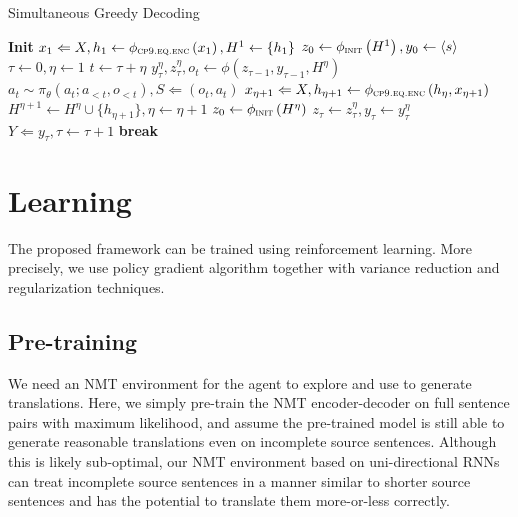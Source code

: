 \begin{algorithm}
\caption{Simultaneous Greedy Decoding}
\label{cp9.algo.algo1}
\begin{algorithmic}[1]
{}
\State \textbf{Init} $x_1 \Leftarrow X, h_1 \gets \phi_{\textsc{cp9.eq.enc}}\left(x_1\right), H^1 \gets \{h_1\}$
\State \hspace{17pt} $z_0 \gets \phi_{\textsc{init}}\left(H^1\right), y_0 \gets \left<s\right>$
\State \hspace{17pt} $\tau \gets 0, \eta \gets 1$
\State $t \gets \tau + \eta$
\State $y_{\tau}^{\eta}, z_{\tau}^{\eta}, o_t \gets \phi\left(z_{\tau-1}, y_{\tau-1}, H^{\eta}\right)$ 
\State $a_t \sim \pi_{\theta}\left(a_t; a_{<t}, o_{<t}\right), S \Leftarrow (o_t, a_t)$
\State $x_{\eta+1} \Leftarrow X, h_{\eta+1} \gets \phi_{\textsc{cp9.eq.enc}}\left(h_{\eta}, x_{\eta+1}\right)$
\State $H^{\eta+1} \gets H^{\eta} \cup \{h_{\eta+1} \}, \eta \gets \eta + 1$
 $z_0 \gets \phi_{\textsc{init}}\left(H^{\eta}\right)$
\EndIf
{}
\State $z_{\tau} \gets z_{\tau}^{\eta}, y_{\tau} \gets y_{\tau}^{\eta}$ 
\State $Y \Leftarrow y_{\tau}, \tau \gets \tau + 1$
 \textbf{break}
\EndIf
\EndIf
\EndWhile
\end{algorithmic}
\end{algorithm}

\section{Learning}
\label{cp9.sec.optimization}
The proposed framework can be trained using reinforcement learning. More precisely, we use policy gradient algorithm together with variance reduction and regularization techniques.
\subsection{Pre-training} 
We need an NMT environment for the agent to explore and use to generate translations.
Here, we simply pre-train the NMT encoder-decoder on full sentence pairs with maximum likelihood, and assume the pre-trained model is still able to generate reasonable translations even on incomplete source sentences.
Although this is likely sub-optimal, our NMT environment based on uni-directional RNNs can treat incomplete source sentences in a manner similar to shorter source sentences and has the potential to translate them more-or-less correctly.%

